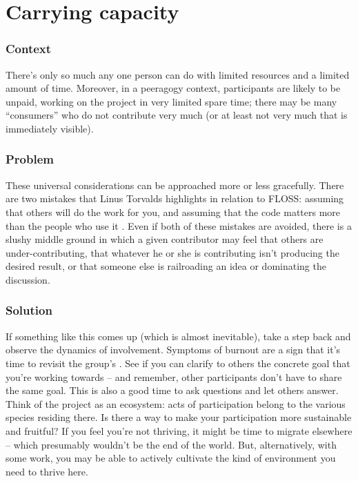 \begingroup \color{OliveGreen}

\section{Carrying capacity}\label{sec:Carrying_capacity}
\subsubsection*{Context} There's only so much any one person can do with
limited resources and a limited amount of time.  Moreover, in a
peeragogy context, participants are likely to be unpaid, working on
the project in very limited spare time; there may be many
``consumers'' who do not contribute very much (or at least not very much that is immediately visible).

\subsubsection*{Problem} These universal considerations can
be approached more or less gracefully.  There are two mistakes that
Linus Torvalds highlights in relation to FLOSS: assuming that others
will do the work for you, and assuming that the code matters more than
the people who use it \cite{torvalds-interview}.  Even if both of these mistakes are avoided,
there is a slushy middle ground in which a given contributor may feel
that others are under-contributing, that whatever he or she is
contributing isn't producing the desired result, or that someone else
is railroading an idea or dominating the discussion.

\subsubsection*{Solution} If something like this comes up (which is almost inevitable),
take a step back and observe the dynamics of involvement.  Symptoms of
burnout are a sign that it's time to revisit the group's
.  See if you can clarify to others the concrete
goal that you're working towards -- and remember, other participants
don't have to share the same goal.  This is also a good time to ask
questions and let others answer.  Think of the project as an
ecosystem: acts of participation belong to the various species
residing there.  Is there a way to make your participation more
sustainable and fruitful?  If you feel you're not thriving, it might
be time to migrate elsewhere -- which presumably wouldn't be the end
of the world.  But, alternatively, with some work, you may be able to
actively cultivate the kind of environment you need to thrive here.

